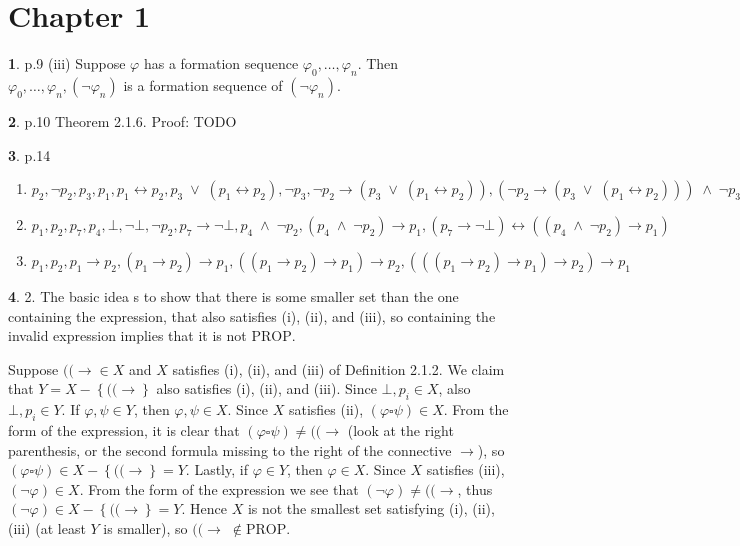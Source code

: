 \documentclass{article}
\theoremstyle{definition}
\newcommand{\AND}{\;\wedge\;}
\newcommand{\OR}{\;\vee\;}
\newcommand{\set}[1]{\left\{#1\right\}}
\theoremstyle{definition}
\theoremstyle{definition}
\newtheorem{solution-internal}{}[subsection]
\newenvironment{solution}{
  \begin{solution-internal}
}{
  \end{solution-internal}
}
\newcommand\PROP{\mathrm{PROP}}
\begin{document}
\section*{Chapter 1}
\setcounter{section}{1}
\setcounter{subsection}{1}

\begin{solution}
  p.9 (iii) Suppose $\varphi$ has a formation sequence
  $\varphi_0,\dots,\varphi_n$. Then $\varphi_0,\dots,\varphi_n, (\neg
  \varphi_n)$ is a formation sequence of $(\neg \varphi_n)$.
\end{solution}
\begin{solution}
  p.10 Theorem 2.1.6.
  Proof: TODO
\end{solution}
\begin{solution}
  p.14
  \begin{enumerate}
    \item $p_2, \neg p_2, p_3, p_1, p_1 \leftrightarrow p_2, p_3 \OR (p_1
      \leftrightarrow p_2), \neg p_3, \neg p_2 \rightarrow (p_3 \OR (p_1
      \leftrightarrow p_2)), (\neg p_2 \rightarrow (p_3 \OR (p_1 \leftrightarrow
      p_2))) \AND \neg p_3$
    \item $p_1, p_2, p_7, p_4, \bot, \neg \bot, \neg p_2, p_7 \rightarrow \neg
      \bot, p_4 \AND \neg p_2, (p_4 \AND \neg p_2) \rightarrow p_1, (p_7
      \rightarrow \neg \bot) \leftrightarrow ((p_4 \AND \neg p_2) \rightarrow
      p_1)$
    \item $p_1, p_2, p_1 \rightarrow p_2, (p_1 \rightarrow p_2) \rightarrow p_1,
      ((p_1 \rightarrow p_2) \rightarrow p_1) \rightarrow p_2, (((p_1
      \rightarrow p_2) \rightarrow p_1) \rightarrow p_2) \rightarrow p_1$
  \end{enumerate}
\end{solution}
\begin{solution}

  2. The basic idea s to show that there is some smaller set than the one
  containing the expression, that also satisfies (i), (ii), and (iii), so
  containing the invalid expression implies that it is not $\PROP$.

  Suppose $((\rightarrow \in X$ and $X$ satisfies (i), (ii), and (iii) of
  Definition 2.1.2. We claim that $Y = X - \set{((\rightarrow}$ also satisfies
  (i), (ii), and (iii). Since $\bot, p_i \in X$, also $\bot, p_i \in Y$. If
  $\varphi, \psi \in Y$, then $\varphi, \psi \in X$. Since $X$ satisfies (ii),
  $(\varphi \square \psi) \in X$. From the form of the expression, it is clear
  that $(\varphi \square \psi) \neq ((\rightarrow$ (look at the right
  parenthesis, or the second formula missing to the right of the connective
  $\rightarrow$), so $(\varphi \square \psi) \in X - \set{((\rightarrow} = Y$.
  Lastly, if $\varphi \in Y$, then $\varphi \in X$. Since $X$ satisfies (iii),
  $(\neg \varphi) \in X$. From the form of the expression we see that $(\neg
  \varphi) \neq ((\rightarrow$, thus $(\neg \varphi) \in X - \set{((\rightarrow}
  = Y$. Hence $X$ is not the smallest set satisfying (i), (ii), (iii) (at least
  $Y$ is smaller), so $((\rightarrow \;\notin \PROP$.
\end{solution}
\end{document}
